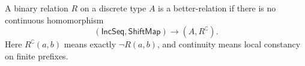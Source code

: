 \begin{definition}
A binary relation $R$ on a discrete type $A$ is a better-relation if there
is no continuous homomorphism
\[
(\mathsf{IncSeq},\mathsf{ShiftMap})
\longrightarrow (A,R^{\complement}).
\]
Here $R^{\complement}(a,b)$ means exactly $\neg R(a,b)$, and continuity
means local constancy on finite prefixes.
\end{definition}
